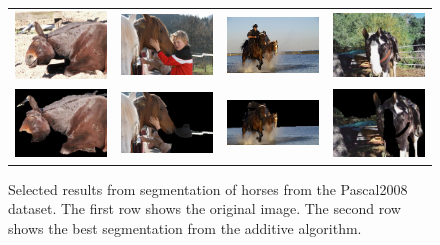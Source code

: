 \documentclass[10pt,twocolumn,letterpaper]{article}
\begin{document}
\begin{figure}[p]
\centering
\begin{tabular}{ p{3cm} p{3cm} p{3cm} p{3cm} }
\includegraphics[width=2.95cm]{figures/add_res/horse/2008_001542.jpg.eps} &
\includegraphics[width=2.95cm]{figures/add_res/horse/2008_001992.jpg.eps} &
\includegraphics[width=2.95cm]{figures/add_res/horse/2008_002172.jpg.eps} &
\includegraphics[width=2.95cm]{figures/add_res/horse/2008_002509.jpg.eps} \\
\includegraphics[width=2.95cm]{figures/add_res/horse/2008_001542.jpg_3_good.jpg.eps} &
\includegraphics[width=2.95cm]{figures/add_res/horse/2008_001992.jpg_3_good.jpg.eps} &
\includegraphics[width=2.95cm]{figures/add_res/horse/2008_002172.jpg_3_good.jpg.eps} &
\includegraphics[width=2.95cm]{figures/add_res/horse/2008_002509.jpg_3_good.jpg.eps} \\
\end{tabular}
\caption{Selected results from segmentation of horses from the Pascal2008
dataset.  The first row shows the original image.  The second row shows
the best segmentation from the additive algorithm.}
\label{fig:horse_good_results}
\end{figure}
\end{document}
